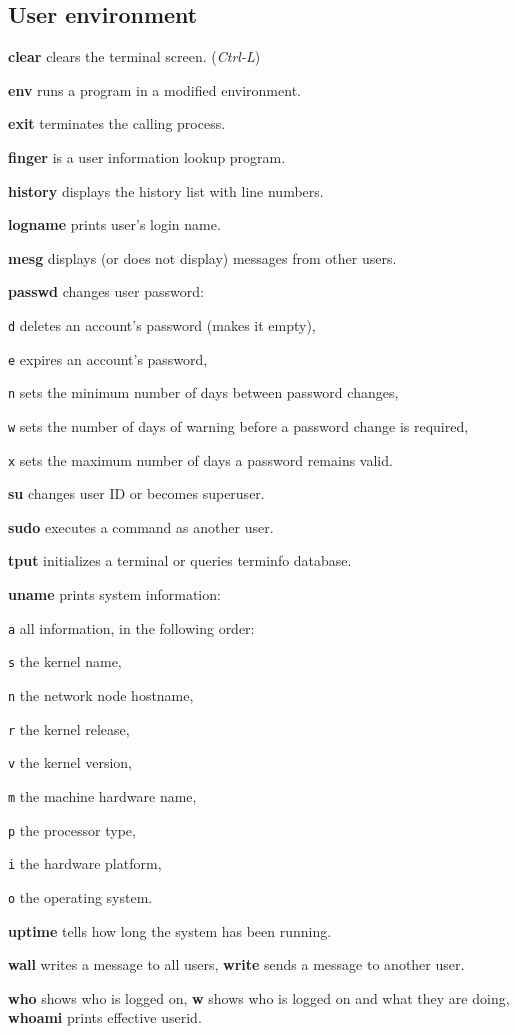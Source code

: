 \subsection{User environment}
\textbf{clear} clears the terminal screen. \hfill (\emph{Ctrl-L}) 

\textbf{env} runs a program in a modified environment.

\textbf{exit} terminates the calling process.

\textbf{finger} is a user information lookup program. 

\textbf{history} displays the history list with line numbers.

\textbf{logname} prints user's login name.

\textbf{mesg} displays (or does not display) messages from other users.

\manualbreak

\textbf{passwd} changes user password:
\begin{enumx}
	\item [\texttt{d}] deletes an account's password (makes it empty),
	\item [\texttt{e}] expires an account's password,
	\item [\texttt{n}] sets the minimum number of days between password changes,
	\item [\texttt{w}] sets the number of days of warning 
	before a password change is required,
	\item [\texttt{x}] sets the maximum number of days a password remains valid.
\end{enumx}

\textbf{su} changes user ID or becomes superuser.

\textbf{sudo} executes a command as another user.


\textbf{tput} initializes a terminal or queries terminfo database.

\textbf{uname} prints system information:
\begin{enumx}
	\item [\texttt{a}] all information, in the following order:
	\item [\texttt{s}] the kernel name,
	\item [\texttt{n}] the network node hostname,
	\item [\texttt{r}] the kernel release,
	\item [\texttt{v}] the kernel version,
	\item [\texttt{m}] the machine hardware name,
	\item [\texttt{p}] the processor type,
	\item [\texttt{i}] the hardware platform,
	\item [\texttt{o}] the operating system.
\end{enumx}

\textbf{uptime} tells how long the system has been running.

\textbf{wall} writes a message to all users,
\textbf{write} sends a message to another user. 

\textbf{who} shows who is logged on,
\textbf{w} shows who is logged on and what they are doing,
\textbf{whoami} prints effective userid.
